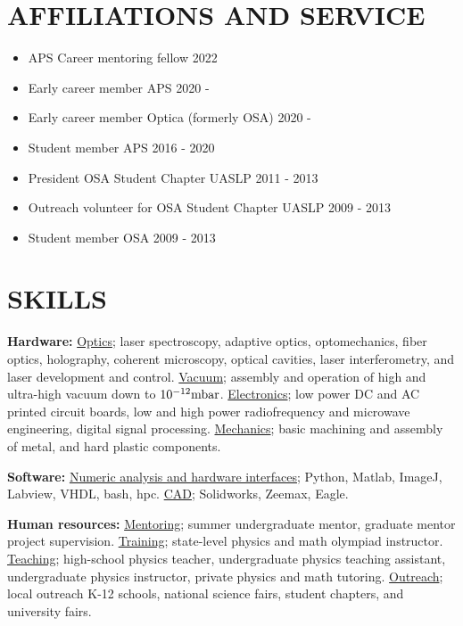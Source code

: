 \documentclass[margin]{res} %
\begin{document}
\begin{resume}
\section{AFFILIATIONS AND SERVICE}
 
\begin{itemize}
    \item{APS Career mentoring fellow \hfill 2022}
    \item{Early career member APS \hfill 2020 -}
    \item{Early career member Optica (formerly OSA) \hfill 2020 -}
    \item{Student member APS \hfill 2016 - 2020}
    \item{President OSA Student Chapter UASLP \hfill 2011 - 2013}
    \item{Outreach volunteer for OSA Student Chapter UASLP \hfill 2009 - 2013}
    \item{Student member OSA \hfill 2009 - 2013}
\end{itemize}

\section{SKILLS}

{\bf Hardware:}
{\underline{Optics};} laser spectroscopy, adaptive optics, optomechanics, fiber optics, holography, coherent microscopy, optical cavities, laser interferometry, and laser development and control. {\underline{Vacuum};} assembly and operation of high and ultra-high vacuum down to ${10^{-12} {\rm mbar}}$. {\underline {Electronics};} low power DC and AC printed circuit boards, low and high power radiofrequency and microwave engineering, digital signal processing. {\underline{Mechanics};} basic machining and assembly of metal, and hard plastic components.

{\bf Software:} 
{\underline{Numeric analysis and hardware interfaces};} Python, Matlab, ImageJ, Labview, VHDL, bash, hpc. {\underline{CAD};} Solidworks, Zeemax, Eagle.

{\bf Human resources:}
{\underline{Mentoring}; summer undergraduate mentor, graduate mentor project supervision. {\underline{Training};} state-level physics and math olympiad instructor. {\underline{Teaching};} high-school physics teacher, undergraduate physics teaching assistant, undergraduate physics instructor, private physics and math tutoring. {\underline{Outreach};} local outreach K-12 schools, national science fairs, student chapters, and university fairs.}

\end{resume}
\end{document}
